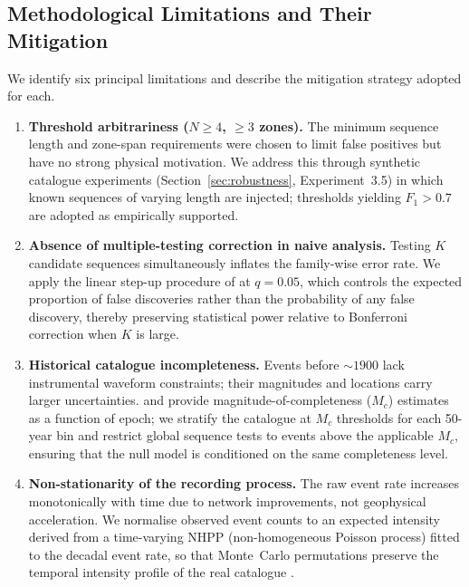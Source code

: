 \subsection{Methodological Limitations and Their Mitigation}
\label{subsec:limitations}

We identify six principal limitations and describe the mitigation strategy
adopted for each.

\begin{enumerate}

\item \textbf{Threshold arbitrariness ($N \geq 4$, $\geq 3$ zones).}
The minimum sequence length and zone-span requirements were chosen to
limit false positives but have no strong physical motivation.  We address
this through synthetic catalogue experiments (Section~\ref{sec:robustness},
Experiment~3.5) in which known sequences of varying length are injected;
thresholds yielding $F_1 > 0.7$ are adopted as empirically supported.

\item \textbf{Absence of multiple-testing correction in naive analysis.}
Testing $K$ candidate sequences simultaneously inflates the family-wise
error rate.  We apply the linear step-up procedure of
\citet{BenjaminiHochberg1995} at $q = 0.05$, which controls the expected
proportion of false discoveries rather than the probability of any false
discovery, thereby preserving statistical power relative to Bonferroni
correction when $K$ is large.

\item \textbf{Historical catalogue incompleteness.}
Events before $\sim\!1900$ lack instrumental waveform constraints; their
magnitudes and locations carry larger uncertainties.
\citet{Wiemer2000} and \citet{Woessner2005} provide magnitude-of-completeness
($M_c$) estimates as a function of epoch; we stratify the catalogue at
$M_c$ thresholds for each 50-year bin and restrict global sequence tests
to events above the applicable $M_c$, ensuring that the null model is
conditioned on the same completeness level.

\item \textbf{Non-stationarity of the recording process.}
The raw event rate increases monotonically with time due to network
improvements, not geophysical acceleration.  We normalise observed event
counts to an expected intensity derived from a time-varying NHPP
(non-homogeneous Poisson process) fitted to the decadal event rate, so
that Monte~Carlo permutations preserve the temporal intensity profile of
the real catalogue \citep{Michael2011, ShearerStark2012}.


\end{enumerate}
